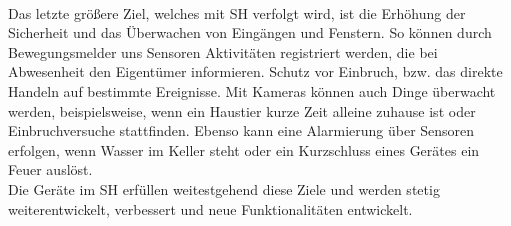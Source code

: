        \\
        \linebreak
        Das letzte größere Ziel, welches mit \acl{SH} verfolgt wird, ist die Erhöhung der Sicherheit und das Überwachen 
        von Eingängen und Fenstern. So können durch Bewegungsmelder uns Sensoren Aktivitäten registriert 
        werden, die bei Abwesenheit den Eigentümer informieren. Schutz vor Einbruch, bzw. das direkte Handeln auf 
        bestimmte Ereignisse. Mit Kameras können auch Dinge überwacht werden, beispielsweise, wenn ein Haustier 
        kurze Zeit alleine zuhause ist oder Einbruchversuche stattfinden. Ebenso kann eine Alarmierung über Sensoren erfolgen, 
        wenn Wasser im Keller steht oder ein Kurzschluss eines Gerätes ein Feuer auslöst. 
        \\
        \linebreak
        Die Geräte im \acl{SH} erfüllen weitestgehend diese Ziele und werden stetig weiterentwickelt, verbessert und neue 
        Funktionalitäten entwickelt.
